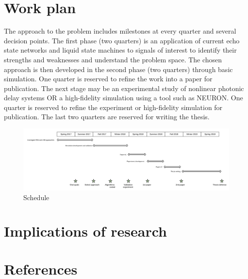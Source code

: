 \documentclass[a4paper,11pt]{article}
\numberwithin{equation}{section}
\begin{document}
\section{Work plan}
The approach to the problem includes milestones at every quarter and several decision points.
The first phase (two quarters) is an application of current echo state networks and liquid state machines to signals of interest to identify their strengths and weaknesses and understand the problem space.
The chosen approach is then developed in the second phase (two quarters) through basic simulation.
One quarter is reserved to refine the work into a paper for publication.
The next stage may be an experimental study of nonlinear photonic delay systems OR a high-fidelity simulation using a tool such as NEURON.
One quarter is reserved to refine the experiment or high-fidelity simulation for publication.
The last two quarters are reserved for writing the thesis.
\begin{figure}
 \caption{Schedule}
 \centering
   \includegraphics[width=\textwidth]{ThesisSchedule}
\end{figure}

\section{Implications of research}

\section{References}
\end{document}
